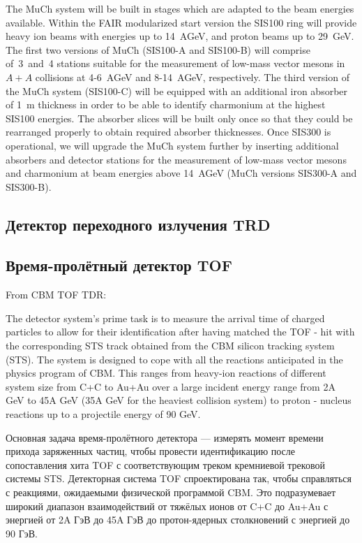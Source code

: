 The MuCh system will be built in stages which are adapted to the beam energies available. Within the FAIR modularized start version the SIS100 ring will provide heavy ion beams with energies up to 14~AGeV, and proton beams up to 29~GeV. The first two versions of MuCh (SIS100-A and SIS100-B) will comprise of~3~and~4 stations suitable for the measurement of low-mass vector mesons in $ A + A $ collisions at 4-6~AGeV and 8-14~AGeV, respectively. The third version of the MuCh system (SIS100-C) will be equipped with an additional iron absorber of 1~m thickness in order to be able to identify charmonium at the highest SIS100 energies. The absorber slices will be built only once so that they could be rearranged properly to obtain required absorber thicknesses. Once SIS300 is operational, we will upgrade the MuCh system further by inserting additional absorbers and detector stations for the measurement of low-mass vector mesons and charmonium at beam energies above 14~AGeV (MuCh versions SIS300-A and SIS300-B).

\subsection{Детектор переходного излучения TRD}\label{sec:secTRD}

\subsection{Время-пролётный детектор TOF}\label{sec:secTOF}

From CBM TOF TDR:

The detector system’s prime task is to measure the arrival time of charged particles to allow for their identification after having matched the TOF - hit with the corresponding STS track obtained from the CBM silicon tracking system (STS). The system is designed to cope with all the reactions anticipated in the physics program of CBM. This ranges from heavy-ion reactions of different system size from C+C to Au+Au over a large incident energy range from 2A GeV to 45A GeV (35A GeV for the heaviest collision system) to proton - nucleus reactions up to a projectile energy of 90 GeV.

Основная задача время-пролётного детектора --- измерять момент времени прихода заряженных частиц, чтобы провести идентификацию после сопоставления хита TOF с соответствующим треком кремниевой трековой системы STS. Детекторная система TOF спроектирована так, чтобы справляться с реакциями, ожидаемыми физической программой CBM. Это подразумевает широкий диапазон взаимодействий от тяжёлых ионов от C+C до Au+Au с энергией от 2A ГэВ до 45A ГэВ до протон-ядерных столкновений с энергией до 90 ГэВ.

